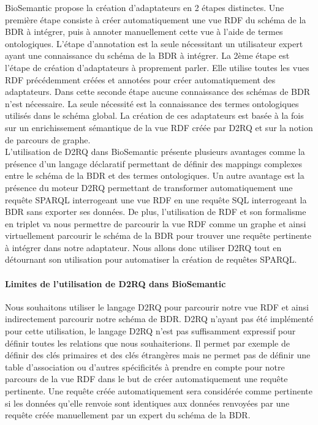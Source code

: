 BioSemantic propose la création d'adaptateurs en 2 étapes distinctes. Une première étape consiste à créer automatiquement une vue RDF du schéma de la BDR à intégrer, puis à annoter manuellement cette vue à l'aide de termes ontologiques. L'étape d'annotation est la seule nécessitant un utilisateur expert ayant une connaissance du schéma de la BDR à intégrer. La 2ème étape est l'étape de création d'adaptateurs à proprement parler. Elle utilise toutes les vues RDF précédemment créées et annotées pour créer automatiquement des adaptateurs. Dans cette seconde étape aucune connaissance des schémas de BDR n'est nécessaire. La seule nécessité est la connaissance des termes ontologiques utilisés dans le schéma global. La création de ces adaptateurs est basée à la fois sur un enrichissement sémantique de la vue RDF créée par D2RQ et sur la notion de parcours de graphe.\\

L'utilisation de D2RQ dans BioSemantic présente plusieurs avantages comme la présence d'un langage déclaratif permettant de définir des mappings complexes entre le schéma de la BDR et des termes ontologiques. Un autre avantage est la présence du moteur D2RQ permettant de transformer automatiquement une requête SPARQL interrogeant une vue RDF en une requête SQL interrogeant la BDR sans exporter ses données. De plus, l'utilisation de RDF et son formalisme en triplet va nous permettre de parcourir la vue RDF comme un graphe et ainsi virtuellement parcourir le schéma de la BDR pour trouver une requête pertinente à intégrer dans notre adaptateur. Nous allons donc utiliser D2RQ tout en détournant son utilisation pour automatiser la création de requêtes SPARQL.

\paragraph*{Limites de l'utilisation de D2RQ dans BioSemantic}
Nous souhaitons utiliser le langage D2RQ pour parcourir notre vue RDF et ainsi indirectement parcourir notre schéma de BDR. D2RQ n'ayant pas été implémenté pour cette utilisation, le langage D2RQ n'est pas suffisamment expressif pour définir toutes les relations que nous souhaiterions. Il permet par exemple de définir des clés primaires et des clés étrangères mais ne permet pas de définir une table d'association ou d'autres spécificités à prendre en compte pour notre parcours de la vue RDF dans le but de créer automatiquement une requête pertinente. Une requête créée automatiquement sera considérée comme pertinente si les données qu'elle renvoie sont identiques aux données renvoyées par une requête créée manuellement par un expert du schéma de la BDR.

